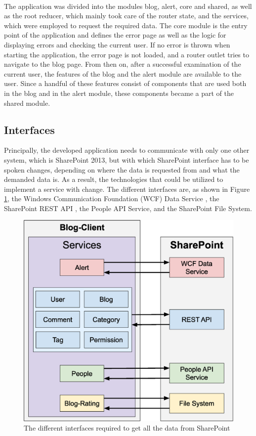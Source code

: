 \documentclass[Bachelor,BIF,english]{twbook}
\begin{document}
\\[\baselineskip]
The application was divided into the modules blog, alert, core and shared, as well as the root reducer, which mainly took care of the router state, and the services, which were employed to request the required data. The core module is the entry point of the application and defines the error page as well as the logic for displaying errors and checking the current user. If no error is thrown when starting the application, the error page is not loaded, and a router outlet tries to navigate to the blog page. From then on, after a successful examination of the current user, the features of the blog and the alert module are available to the user. Since a handful of these features consist of components that are used both in the blog and in the alert module, these components became a part of the shared module.


\subsection{Interfaces}
Principally, the developed application needs to communicate with only one other system, which is SharePoint 2013, but with which SharePoint interface has to be spoken changes, depending on where the data is requested from and what the demanded data is. As a result, the technologies that could be utilized to implement a service with change. The different interfaces are, as shown in Figure \ref{Fig7}, the Windows Communication Foundation (WCF) Data Service \cite{SPWcf}, the SharePoint REST API \cite{SPRest}, the People API Service, and the SharePoint File System.
\\[\baselineskip]
\begin{figure}[!htbp]
\centering
\includegraphics[width=0.625\linewidth]{PICs/communication_sharepoint_services.eps}
\caption{The different interfaces required to get all the data from SharePoint}\label{Fig7}
\end{figure}
\end{document}
